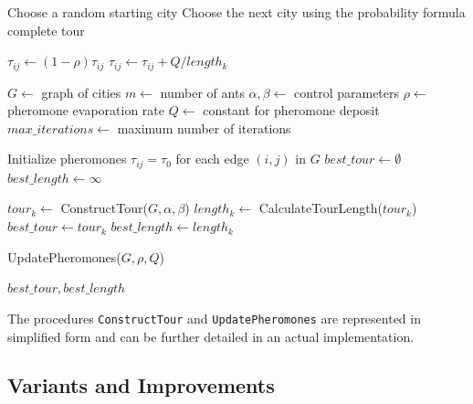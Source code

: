 \begin{algorithm}
	\begin{algorithmic}[1]
		\State Choose a random starting city
		\State Choose the next city using the probability formula
		\EndWhile
		\State \Return complete tour
		\EndProcedure

		\State $\tau_{ij} \gets (1-\rho)\tau_{ij}$
		\State $\tau_{ij} \gets \tau_{ij} + Q/length_k$
		\EndIf
		\EndFor
		\EndFor
		\EndProcedure
	\end{algorithmic}
\end{algorithm}

\begin{algorithm}
	\caption{\Gls{ACO} for the \Gls{TSP}}\label{alg:aco-tsp}
	\begin{algorithmic}[1]
		\State $G \gets$ graph of cities
		\State $m \gets$ number of ants
		\State $\alpha, \beta \gets$ control parameters
		\State $\rho \gets$ pheromone evaporation rate
		\State $Q \gets$ constant for pheromone deposit
		\State $max\_iterations \gets$ maximum number of iterations

		\State Initialize pheromones $\tau_{ij} = \tau_0$ for each edge $(i,j)$ in $G$
		\State $best\_tour \gets \emptyset$
		\State $best\_length \gets \infty$

		\State $tour_k \gets$ ConstructTour($G, \alpha, \beta$)
		\State $length_k \gets$ CalculateTourLength($tour_k$)
		\State $best\_tour \gets tour_k$
		\State $best\_length \gets length_k$
		\EndIf
		\EndFor

		\State UpdatePheromones($G, \rho, Q$)
		\EndFor

		\State \Return $best\_tour, best\_length$
		\EndProcedure

	\end{algorithmic}
\end{algorithm}

The procedures \texttt{ConstructTour} and \texttt{UpdatePheromones} are represented in simplified form and can be further detailed in an actual implementation.

\subsection{Variants and Improvements}

